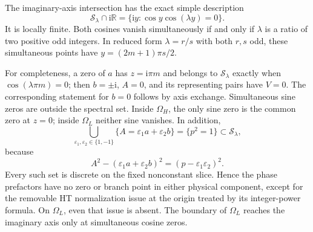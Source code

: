 \documentclass[11pt]{article}
\numberwithin{equation}{section}
\theoremstyle{definition}
\newcommand{\R}{\mathbb R}
\newcommand{\ii}{\mathrm i}
\newcommand{\eps}{\varepsilon}
\newcommand{\cS}{\mathcal S}
\newcommand{\OH}{\Omega_H}
\newcommand{\OL}{\Omega_L}
\begin{document}
The imaginary-axis intersection has the exact simple description
\begin{equation}\label{eq:imagaxisS}
 \cS_\lambda\cap\ii\R
 =\{\ii y:\cos y\cos(\lambda y)=0\}.
\end{equation}
It is locally finite. Both cosines vanish simultaneously if and only
if \(\lambda\) is a ratio of two positive odd integers. In reduced
form \(\lambda=r/s\) with both \(r,s\) odd, these simultaneous
points have \(y=(2m+1)\pi s/2\).

For completeness, a zero of \(a\) has \(z=\ii\pi m\) and belongs
to \(\cS_\lambda\) exactly when \(\cos(\lambda\pi m)=0\);
then \(b=\pm\ii\), \(A=0\), and its representing pairs have
\(V=0\). The corresponding statement for \(b=0\) follows by
axis exchange. Simultaneous sine zeros are outside the spectral set.
Inside \(\OH\), the only sine zero is the common zero at \(z=0\);
inside \(\OL\) neither sine vanishes. In addition,
\begin{equation}\label{eq:cornerp}
 \bigcup_{\eps_1,\eps_2\in\{1,-1\}}
 \{A=\eps_1 a+\eps_2b\}=\{p^2=1\}\subset\cS_\lambda,
\end{equation}
because
\[
 A^2-(\eps_1 a+\eps_2 b)^2=(p-\eps_1\eps_2)^2.
\]
Every such set is discrete on the fixed nonconstant slice. Hence
the phase prefactors have no zero or branch point in either physical
component, except for the removable HT normalization issue at the
origin treated by its integer-power formula. On \(\OL\), even that
issue is absent. The boundary of \(\OL\) reaches the imaginary axis
only at simultaneous cosine zeros.
\end{document}
